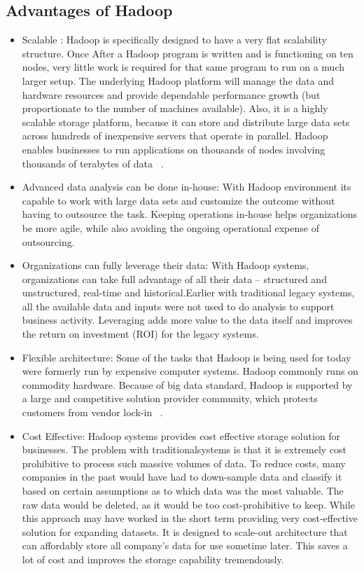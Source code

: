 \subsection{Advantages of Hadoop}
\begin{itemize}

\item Scalable : 
Hadoop is specifically designed to have a very flat scalability structure. 
Once After a Hadoop program is written and is functioning on ten nodes, very 
little work is required for that same program to run on a much larger setup. 
The underlying Hadoop platform will manage the data and hardware resources and 
provide dependable performance growth (but proportionate to the number of 
machines available). Also, it is a highly scalable storage platform, because it 
can store and distribute large data sets across hundreds of inexpensive servers 
that operate in parallel. Hadoop enables businesses to run applications on 
thousands of nodes involving thousands of terabytes of data
~\cite{hid-sp18-406-hadoop-intro8}.

\item Advanced data analysis can be done in-house: 
With Hadoop environment its capable to work with large data sets and customize 
the outcome without having to outsource the task. Keeping operations in-house 
helps organizations be more agile, while also avoiding the ongoing operational 
expense of outsourcing.

\item Organizations can fully leverage their data: 
With Hadoop systems, organizations can take full advantage of all their data – 
structured and unstructured, real-time and historical.Earlier with traditional 
legacy systems, all the available data and inputs were not used to do analysis 
to support business activity. Leveraging adds more value to the data itself and 
improves the return on investment (ROI) for the legacy systems.

\item Flexible architecture: 
Some of the tasks that Hadoop is being used for today were formerly run by 
expensive computer systems. Hadoop commonly runs on commodity hardware. Because 
of big data standard, Hadoop is supported by a large and competitive solution 
provider community, which protects customers from vendor lock-in
~\cite{hid-sp18-406-hadoop-intro9}.

\item Cost Effective: 
Hadoop systems provides cost effective storage solution for businesses. The 
problem with traditionalsystems is that it is extremely cost prohibitive to 
process such massive volumes of data. To reduce costs, many companies in the 
past would have had to down-sample data and classify it based on certain 
assumptions as to which data was the most valuable. The raw data would be 
deleted, as it would be too cost-prohibitive to keep. While this approach may 
have worked in the short term providing very cost-effective solution for 
expanding datasets. It is designed to scale-out architecture that can affordably
store all company's data for use sometime later. This saves a lot of cost and 
improves the storage capability tremendously.


\end{itemize}
